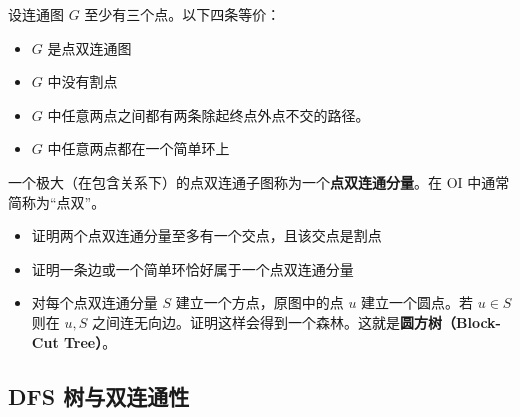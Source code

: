 \begin{lemma}[点双连通的刻画]
    设连通图 $G$ 至少有三个点。以下四条等价：
\begin{itemize}
    \item $G$ 是点双连通图
    \item $G$ 中没有割点
    \item $G$ 中任意两点之间都有两条除起终点外点不交的路径。
    \item $G$ 中任意两点都在一个简单环上
\end{itemize}
\end{lemma}



\begin{definition}[点双连通分量]
    一个极大（在包含关系下）的点双连通子图称为一个\textbf{点双连通分量}。在 OI 中通常简称为“点双”。
\end{definition}
\begin{exercise}[点双缩点]
    \begin{itemize}
        \item 证明两个点双连通分量至多有一个交点，且该交点是割点
        \item 证明一条边或一个简单环恰好属于一个点双连通分量
        \item 对每个点双连通分量 $S$ 建立一个方点，原图中的点 $u$ 建立一个圆点。若 $u\in S$ 则在 $u,S$ 之间连无向边。证明这样会得到一个森林。这就是\textbf{圆方树（Block-Cut Tree）}。
    \end{itemize}
\end{exercise}

\subsection{DFS 树与双连通性}

